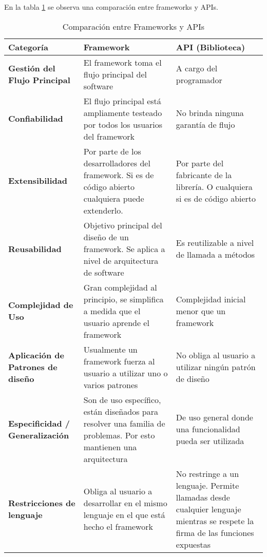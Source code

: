En la tabla \ref {tab:comparacion_frameworks_apis} se observa una comparación
entre frameworks y APIs.
\begin{table}
	\centering
	\begin{tabularx}{\textwidth}{ | p{2.5cm} | X | X | }
	\hline
	\textbf{Categoría} & \textbf{Framework} & \textbf{API (Biblioteca)} \\[10pt]
	\hline
    \textbf{Gestión del Flujo Principal} & El framework toma el
    flujo principal del software & A cargo del programador\\[10pt] \hline
    \textbf{Confiabilidad} & El flujo principal está ampliamente testeado por todos
    los usuarios del framework & No brinda ninguna garantía de flujo\\[10pt] \hline
	\hline \textbf{Extensibilidad} & Por parte de los desarrolladores del
	framework.
	Si es de código abierto cualquiera puede extenderlo. & Por parte del fabricante de la
	librería.
	O cualquiera si es de código abierto \\[10pt] \hline
	\textbf{Reusabilidad} & Objetivo principal del diseño de un framework.
	Se aplica a nivel de arquitectura de software & Es reutilizable a nivel
	de llamada a métodos\\[10pt] \hline 
	\textbf{Complejidad de Uso} & Gran
	complejidad al principio, se simplifica a medida que el usuario aprende el framework & Complejidad inicial menor que un
	framework\\[10pt] \hline 
	\textbf{Aplicación de Patrones de diseño} & Usualmente un framework fuerza al
	usuario a utilizar uno o varios patrones & No obliga al usuario a utilizar ningún patrón
	de diseño\\[10pt] \hline 
	\textbf{Especificidad / Generalización} & Son de uso específico,
	están diseñados para resolver una familia de problemas. Por esto mantienen una
	arquitectura & De uso general donde una funcionalidad pueda ser
	utilizada\\[10pt] \hline 
	\textbf{Restricciones de lenguaje} & Obliga al usuario a
	desarrollar en el mismo lenguaje en el que está hecho el framework & No restringe a un lenguaje.
	Permite llamadas desde cualquier lenguaje mientras se respete la firma de las funciones expuestas\\[10pt] 
	\hline
	\end{tabularx}
	\caption{Comparación entre Frameworks y APIs}
	\label{tab:comparacion_frameworks_apis}
\end{table}

